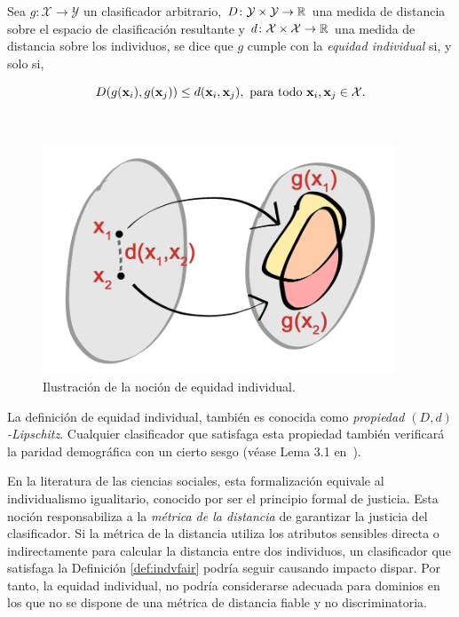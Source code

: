 \documentclass[oneside,openright,titlepage,numbers=noenddot,openany,headinclude,footinclude=true,
cleardoublepage=empty,abstractoff,BCOR=5mm,paper=a4,fontsize=12pt,main=spanish]{scrreprt}
\begin{document}
\begin{definition} \label{def:indvfair}
Sea $g\colon \mathcal{X} \to \mathcal{Y}$ un clasificador arbitrario, $D\colon \mathcal{Y} \times \mathcal{Y} \to \mathbb{R}$ una medida de distancia sobre el espacio de clasificación resultante y $d\colon \mathcal{X} \times \mathcal{X} \to \mathbb{R}$ una medida de distancia sobre los individuos, se dice que $g$ cumple con la \textit{equidad individual} si, y solo si,

\begin{equation*} 
D(g(\textbf{x}_i),g(\textbf{x}_j))\leq d(\textbf{x}_i,\textbf{x}_j), \ \text{para todo} \ \textbf{x}_i,\textbf{x}_j \in \mathcal{X}.
\end{equation*}
\end{definition}\

\begin{figure}[h]
	\centering
	\includegraphics[width=10.5cm]{individual_fair.jpg}
	\caption{Ilustración de la noción de equidad individual.}
    \label{fig:individual_fairness}
\end{figure}

La definición de equidad individual, también es conocida como \textit{propiedad $(D,d)$-Lipschitz}. Cualquier clasificador que satisfaga esta propiedad también verificará la paridad demográfica con un cierto sesgo (véase Lema 3.1 en~\cite{detect2012}).

En la literatura de las ciencias sociales, esta formalización
equivale al individualismo igualitario, conocido por ser el principio formal de justicia. Esta noción responsabiliza a la \textit{métrica de la distancia} de garantizar la justicia del clasificador. Si la métrica de la distancia utiliza los atributos sensibles directa o indirectamente para calcular la distancia entre dos individuos, un clasificador que satisfaga la Definición \ref{def:indvfair} podría seguir causando impacto dispar. Por tanto, la equidad individual, no podría considerarse adecuada para dominios en los que no se dispone de una métrica de distancia fiable y no discriminatoria.
\end{document}
